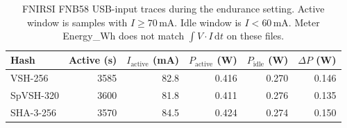\begin{table}[ht]
\caption{FNIRSI FNB58 USB-input traces during the endurance setting. Active window is samples with $I\geq 70$\,mA. Idle window is $I<60$\,mA. Meter Energy\_Wh does not match $\int V\cdot I\,\mathrm{d}t$ on these files.}
\label{tab:fnb58}
\centering
\begin{tabular}{@{}lrrrrr@{}}
\toprule
Hash & Active (s) & $I_\mathrm{active}$ (mA) & $P_\mathrm{active}$ (W) & $P_\mathrm{idle}$ (W) & $\Delta P$ (W) \\
\midrule
VSH-256 & 3585 & 82.8 & 0.416 & 0.270 & 0.146 \\
SpVSH-320 & 3600 & 81.8 & 0.411 & 0.276 & 0.135 \\
SHA-3-256 & 3570 & 84.5 & 0.424 & 0.274 & 0.150 \\
\bottomrule
\end{tabular}
\end{table}
